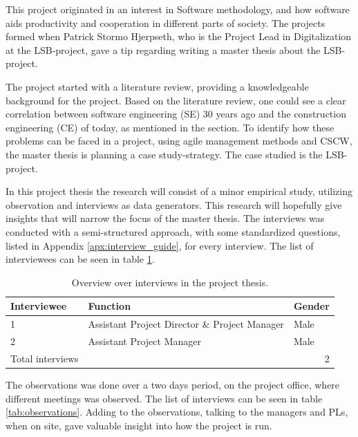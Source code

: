 This project originated in an interest in Software methodology, and how software aids productivity and cooperation in different parts of society. The projects formed when Patrick Stormo Hjerpseth, who is the Project Lead in Digitalization at the LSB-project, gave a tip regarding writing a master thesis about the LSB-project.

The project started with a literature review, providing a knowledgeable background for the project. Based on the literature review, one could see a clear correlation between software engineering (SE) 30 years ago and the construction engineering (CE) of today, as mentioned in the  section. To identify how these problems can be faced in a project, using agile management methods and CSCW, the master thesis is planning a case study-strategy. The case studied is the LSB-project. 

In this project thesis the research will consist of a minor empirical study, utilizing observation and interviews as data generators. This research will hopefully give insights that will narrow the focus of the master thesis. The interviews was conducted with a semi-structured approach, with some standardized questions, listed in Appendix \ref{apx:interview_guide}, for every interview. The list of interviewees can be seen in table \ref{tab:paticipants}. 

\begin{table}[]
    \begin{center}
        \begin{tabular}{@{}lll@{}}
        \toprule
        \textbf{Interviewee} & \textbf{Function}          & \textbf{Gender} \\ \midrule
        1                    & Assistant Project Director \& Project Manager & Male            \\
        2                    & Assistant Project Manager  & Male            \\
        Total interviews     & \multicolumn{2}{r}{2}                        \\ \bottomrule
        \end{tabular}
        \caption{Overview over interviews in the project thesis.}
        \label{tab:paticipants}
    \end{center}
\end{table}

The observations was done over a two days period, on the project office, where different meetings was observed. The list of interviews can be seen in table \ref{tab:observations}. Adding to the observations, talking to the managers and PLs, when on site, gave valuable insight into how the project is run.

